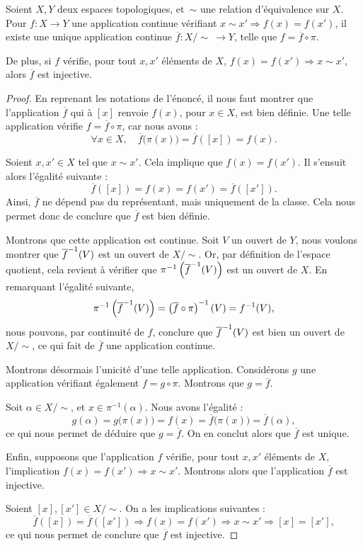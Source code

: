 \documentclass[hidelinks, 10pt]{article}
\begin{document}
\begin{theorem}\label{th:quotient}
Soient $X,Y$ deux espaces topologiques, et~$\sim$ une relation d'équivalence sur $X$. Pour $f:X\to Y$ une application continue vérifiant $x\sim x'\Rightarrow f(x)=f(x')$, il existe une unique application continue $\overline{f}:X/\!\sim\ \longrightarrow Y$, telle que $f=\overline{f}\circ \pi$.

De plus, si $f$ vérifie, pour tout $x,x'$ éléments de $X$, $f(x)=f(x')\Rightarrow x\sim x'$, alors $\overline{f}$ est injective.
\end{theorem}
\begin{proof}
En reprenant les notations de l'énoncé, il nous faut montrer que l'application $\overline{f}$ qui à $[x]$ renvoie $f(x)$, pour $x\in X$, est bien définie. Une telle application vérifie $f=\overline{f}\circ \pi$, car nous avons : \[\forall x\in X,\quad \overline{f}\big(\pi(x)\big)=\overline{f}([x])=f(x).\]

Soient $x,x'\in X$ tel que $x\sim x'$. Cela implique que $f(x)=f(x')$. Il s'ensuit alors l'égalité suivante : \[
\overline{f}([x])=f(x)=f(x')=\overline{f}([x']).\]Ainsi, $\overline{f}$ ne dépend pas du représentant, mais uniquement de la classe. Cela nous permet donc de conclure que $\overline{f}$ est bien définie. 

\bigskip Montrons que cette application est continue. Soit $V$ un ouvert de $Y$, nous voulons montrer que $\overline{f}^{-1}(V)$ est un ouvert de $X/\sim$. Or, par définition de l'espace quotient, cela revient à vérifier que $\pi^{-1}\left(\overline{f}^{-1}(V)\right)$ est un ouvert de $X$. En remarquant l'égalité suivante, \[\pi^{-1}\left(\overline{f}^{-1}(V)\right)=\left(\overline{f}\circ\pi\right)^{-1}(V)=f^{-1}(V),\]nous pouvons, par continuité de $f$, conclure que $\overline{f}^{-1}(V)$ est bien un ouvert de~$X/\sim$, ce qui fait de $\overline{f}$ une application continue.

\bigskip Montrons désormais l'unicité d'une telle application. Considérons $g$ une application vérifiant également $f=g\circ\pi$. Montrons que $g=\overline{f}$.

Soit $\alpha\in X/\!\sim$, et $x\in\pi^{-1}(\alpha)$. Nous avons l'égalité : \[g(\alpha)=g\big(\pi(x)\big)=f(x)=\overline{f}\big(\pi(x)\big)=\overline{f}(\alpha),\]ce qui nous permet de déduire que $g=\overline{f}$. On en conclut alors que $\overline{f}$ est unique.

\bigskip Enfin, supposons que l'application $f$ vérifie, pour tout $x,x'$ éléments de $X$, l'implication $f(x)=f(x')\Rightarrow x\sim x'$. Montrons alors que l'application $\overline{f}$ est injective.

Soient $[x],[x']\in X/\sim$. On a les implications suivantes : \[\overline{f}([x])=\overline{f}([x'])\Longrightarrow f(x)=f(x')\Longrightarrow x\sim x'\Longrightarrow [x]=[x'],\]ce qui nous permet de conclure que $\overline{f}$ est injective.
\end{proof}
\end{document}
